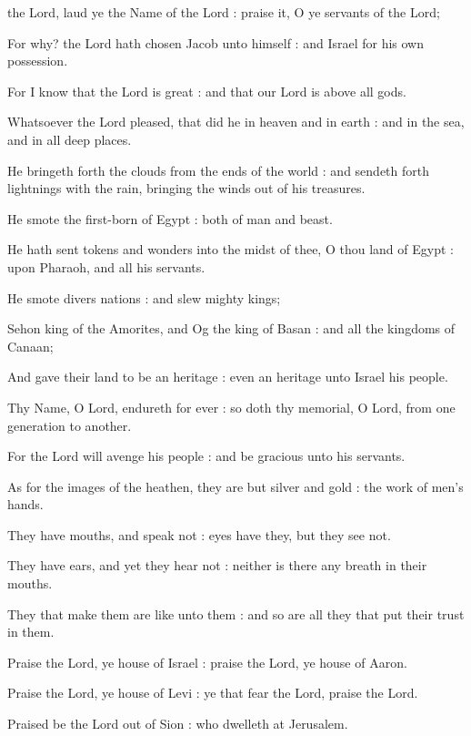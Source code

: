  the Lord, laud ye the Name of the Lord : praise it, O ye servants of the Lord;\par
{}
For why? the Lord hath chosen Jacob unto himself : and Israel for his own possession.\par
{}For I know that the Lord is great : and that our Lord is above all gods.\par
{}Whatsoever the Lord pleased, that did he in heaven and in earth : and in the sea, and in all deep places.\par
{}He bringeth forth the clouds from the ends of the world : and sendeth forth lightnings with the rain, bringing the winds out of his treasures.\par
{}He smote the first-born of Egypt : both of man and beast.\par
{}He hath sent tokens and wonders into the midst of thee, O thou land of Egypt : upon Pharaoh, and all his servants.\par
{}He smote divers nations : and slew mighty kings;\par
{}Sehon king of the Amorites, and Og the king of Basan : and all the kingdoms of Canaan;\par
{}And gave their land to be an heritage : even an heritage unto Israel his people.\par
{}Thy Name, O Lord, endureth for ever : so doth thy memorial, O Lord, from one generation to another.\par
{}For the Lord will avenge his people : and be gracious unto his servants.\par
{}As for the images of the heathen, they are but silver and gold : the work of men's hands.\par
{}They have mouths, and speak not : eyes have they, but they see not.\par
{}They have ears, and yet they hear not : neither is there any breath in their mouths.\par
{}They that make them are like unto them : and so are all they that put their trust in them.\par
{}Praise the Lord, ye house of Israel : praise the Lord, ye house of Aaron.\par
{}Praise the Lord, ye house of Levi : ye that fear the Lord, praise the Lord.\par
{}Praised be the Lord out of Sion : who dwelleth at Jerusalem.\par

